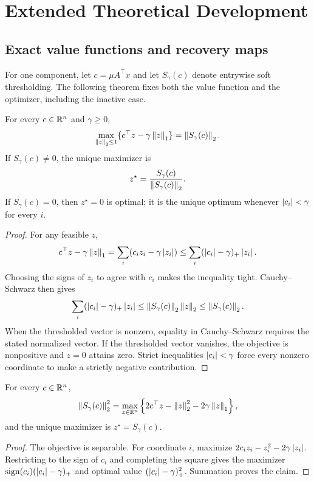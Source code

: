 \section{Extended Theoretical Development}
\label{sec:extended-theory}

\subsection{Exact value functions and recovery maps}
For one component, let $c=\mu A^\top x$ and let $S_\gamma(c)$ denote entrywise soft thresholding. The following theorem fixes both the value function and the optimizer, including the inactive case.

\begin{theorem}
\label{thm:a-loading-elimination}
For every $c\in\mathbb{R}^n$ and $\gamma\ge0$,
\[
\max_{\left\lVert z \right\rVert_2\le1}\{c^\top z-\gamma\left\lVert z \right\rVert_1\}=\left\lVert S_\gamma(c) \right\rVert_2.
\]
If $S_\gamma(c)\neq0$, the unique maximizer is
\[
z^\star=\frac{S_\gamma(c)}{\left\lVert S_\gamma(c) \right\rVert_2}.
\]
If $S_\gamma(c)=0$, then $z^\star=0$ is optimal; it is the unique optimum whenever $\left\lvert c_i \right\rvert<\gamma$ for every $i$.
\end{theorem}
\begin{proof}
For any feasible $z$,
\[
c^\top z-\gamma\left\lVert z \right\rVert_1
=\sum_i (c_i z_i-\gamma\left\lvert z_i \right\rvert)
\le \sum_i (\left\lvert c_i \right\rvert-\gamma)_+\left\lvert z_i \right\rvert.
\]
Choosing the signs of $z_i$ to agree with $c_i$ makes the inequality tight. Cauchy--Schwarz then gives
\[
\sum_i (\left\lvert c_i \right\rvert-\gamma)_+\left\lvert z_i \right\rvert
\le \left\lVert S_\gamma(c) \right\rVert_2\left\lVert z \right\rVert_2
\le \left\lVert S_\gamma(c) \right\rVert_2.
\]
When the thresholded vector is nonzero, equality in Cauchy--Schwarz requires the stated normalized vector. If the thresholded vector vanishes, the objective is nonpositive and $z=0$ attains zero. Strict inequalities $\left\lvert c_i \right\rvert<\gamma$ force every nonzero coordinate to make a strictly negative contribution.
\end{proof}

\begin{theorem}
\label{thm:a-quadratic-lift}
For every $c\in\mathbb{R}^n$,
\[
\left\lVert S_\gamma(c) \right\rVert_2^2
=\max_{z\in\mathbb{R}^n}\left\{2c^\top z-\left\lVert z \right\rVert_2^2-2\gamma\left\lVert z \right\rVert_1\right\},
\]
and the unique maximizer is $z^\star=S_\gamma(c)$.
\end{theorem}
\begin{proof}
The objective is separable. For coordinate $i$, maximize
$2c_i z_i-z_i^2-2\gamma\left\lvert z_i \right\rvert$. Restricting to the sign of $c_i$ and completing the square gives the maximizer $\operatorname{sign}(c_i)(\left\lvert c_i \right\rvert-\gamma)_+$ and optimal value $(\left\lvert c_i \right\rvert-\gamma)_+^2$. Summation proves the claim.
\end{proof}

